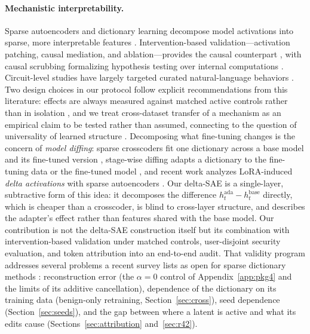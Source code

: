 \documentclass[10pt]{article} %
\begin{document}
\paragraph{Mechanistic interpretability.}
Sparse autoencoders and dictionary learning decompose model activations into
sparse, more interpretable features
\citep{cunningham2023sparse,bricken2023monosemanticity,gao2024scaling}.
Intervention-based validation---activation patching, causal mediation, and
ablation---provides the causal counterpart
\citep{vig2020investigating,meng2022locating,zhang2023best,heimersheim2024use},
with causal scrubbing formalizing hypothesis testing over internal computations
\citep{chan2022causal}. Circuit-level studies have largely targeted curated
natural-language behaviors \citep{wang2023interpretability}. Two design choices
in our protocol follow explicit recommendations from this literature: effects
are always measured against matched active controls rather than in isolation
\citep{zhang2023best}, and we treat cross-dataset transfer of a mechanism as an
empirical claim to be tested rather than assumed, connecting to the question
of universality of learned structure \citep{olah2020zoom,chughtai2023toy}.
Decomposing what fine-tuning changes is the concern of \emph{model diffing}:
sparse crosscoders fit one dictionary across a base model and its fine-tuned
version \citep{lindsey2024crosscoders}, stage-wise diffing adapts a
dictionary to the fine-tuning data or the fine-tuned model
\citep{bricken2024stagewise}, and recent work analyzes LoRA-induced
\emph{delta activations} with sparse autoencoders \citep{prasanth2026lora}.
Our delta-SAE is a single-layer, subtractive form of this idea: it
decomposes the difference $h^{\mathrm{ada}}_t - h^{\mathrm{base}}_t$
directly, which is cheaper than a crosscoder, is blind to cross-layer
structure, and describes the adapter's effect rather than features shared
with the base model. Our contribution is not the delta-SAE construction
itself but its combination with intervention-based validation under matched
controls, user-disjoint security evaluation, and token attribution into an
end-to-end audit. That validity program addresses several problems a recent
survey lists as open for sparse dictionary methods \citep{sharkey2025open}:
reconstruction error (the $\alpha{=}0$ control of Appendix~\ref{app:pkg4}
and the limits of its additive cancellation), dependence of the dictionary on
its training data (benign-only retraining, Section~\ref{sec:cross}), seed
dependence (Section~\ref{sec:seeds}), and the gap between where a latent is
active and what its edits cause (Sections~\ref{sec:attribution}
and~\ref{sec:r42}).
\end{document}
